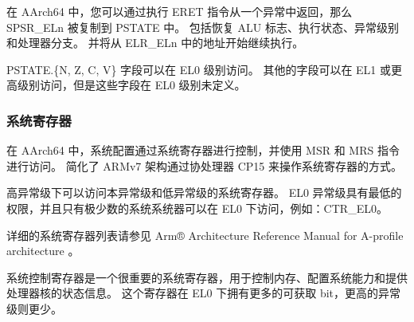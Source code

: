 在 AArch64 中，您可以通过执行 ERET 指令从一个异常中返回，那么 SPSR\_ELn 被复制到 PSTATE 中。
包括恢复 ALU 标志、执行状态、异常级别和处理器分支。
并将从 ELR\_ELn 中的地址开始继续执行。

PSTATE.\{N, Z, C, V\} 字段可以在 EL0 级别访问。
其他的字段可以在 EL1 或更高级别访问，但是这些字段在 EL0 级别未定义。

\subsubsection{系统寄存器}

在 AArch64 中，系统配置通过系统寄存器进行控制，并使用 MSR 和 MRS 指令进行访问。
简化了 ARMv7 架构通过协处理器 CP15 来操作系统寄存器的方式。

高异常级下可以访问本异常级和低异常级的系统寄存器。
EL0 异常级具有最低的权限，并且只有极少数的系统系统器可以在 EL0 下访问，例如：CTR\_EL0。

详细的系统寄存器列表请参见 Arm® Architecture Reference Manual for A-profile architecture \cite{armrefman}。


系统控制寄存器是一个很重要的系统寄存器，用于控制内存、配置系统能力和提供处理器核的状态信息。
这个寄存器在 EL0 下拥有更多的可获取 bit，更高的异常级则更少。


